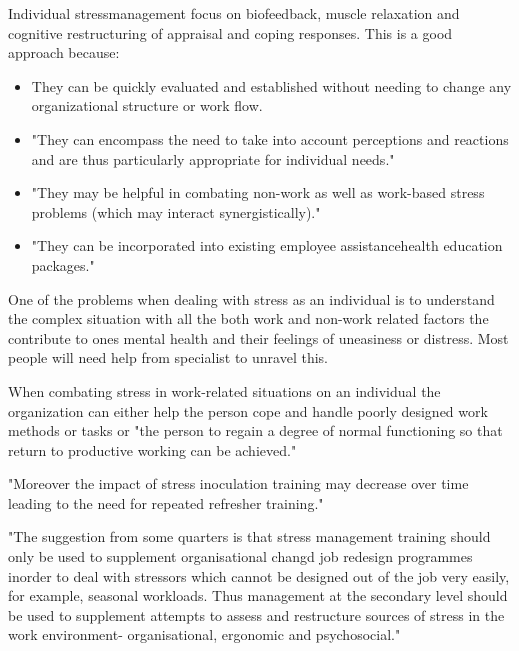 Individual stressmanagement focus on biofeedback, muscle relaxation and cognitive restructuring of appraisal and coping responses. This is a good approach because:

\begin{itemize}
\item They can be quickly evaluated and established without needing to change any organizational structure or work flow.
\item "They can encompass the need to take into account perceptions and reactions and are thus particularly appropriate for individual needs."
\item "They may be helpful in combating non-work as well as work-based stress problems (which may interact synergistically)."
\item "They can be incorporated into existing employee assistancehealth education packages."
\end{itemize}

One of the problems when dealing with stress as an individual is to understand the complex situation with all the both work and non-work related factors the contribute to ones mental health and their feelings of uneasiness or distress. Most people will need help from specialist to unravel this.

When combating stress in work-related situations on an individual the organization can either help the person cope and handle poorly designed work methods or tasks or "the person to regain a degree of normal functioning so that return to productive working can be achieved."

"Moreover the impact of stress inoculation training may decrease over time leading to the need for repeated refresher training."

"The suggestion from some quarters is that stress management training should only be used to supplement organisational changd job redesign programmes inorder to deal with stressors which cannot be designed out of the job very easily, for example, seasonal workloads. Thus management at the secondary level should be used to supplement attempts to assess and restructure sources of stress in the work environment- organisational, ergonomic and psychosocial."